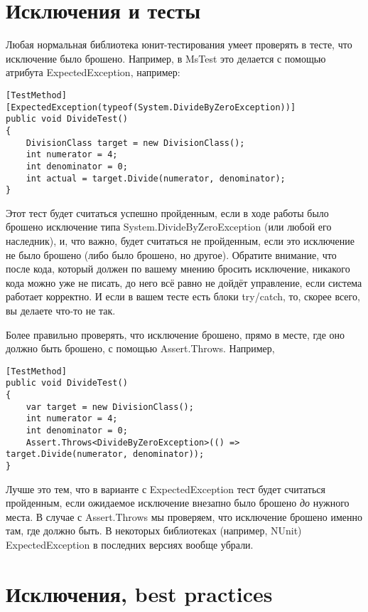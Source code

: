 \documentclass[a5paper]{article}
\begin{document}
\section{Исключения и тесты}

Любая нормальная библиотека юнит-тестирования умеет проверять в тесте, что исключение было брошено. Например, в MsTest это делается с помощью атрибута ExpectedException, например: 

\begin{verbatim}
[TestMethod]
[ExpectedException(typeof(System.DivideByZeroException))]
public void DivideTest()
{
    DivisionClass target = new DivisionClass();
    int numerator = 4;
    int denominator = 0;
    int actual = target.Divide(numerator, denominator);
}
\end{verbatim}

Этот тест будет считаться успешно пройденным, если в ходе работы было брошено исключение типа System.DivideByZeroException (или любой его наследник), и, что важно, будет считаться не пройденным, если это исключение не было брошено (либо было брошено, но другое). Обратите внимание, что после кода, который должен по вашему мнению бросить исключение, никакого кода можно уже не писать, до него всё равно не дойдёт управление, если система работает корректно. И если в вашем тесте есть блоки try/catch, то, скорее всего, вы делаете что-то не так.

Более правильно проверять, что исключение брошено, прямо в месте, где оно должно быть брошено, с помощью Assert.Throws. Например,

\begin{verbatim}
[TestMethod]
public void DivideTest()
{
    var target = new DivisionClass();
    int numerator = 4;
    int denominator = 0;
    Assert.Throws<DivideByZeroException>(() => target.Divide(numerator, denominator));
}
\end{verbatim}

Лучше это тем, что в варианте с ExpectedException тест будет считаться пройденным, если ожидаемое исключение внезапно было брошено \emph{до} нужного места. В случае с Assert.Throws мы проверяем, что исключение брошено именно там, где должно быть. В некоторых библиотеках (например, NUnit) ExpectedException в последних версиях вообще убрали.

\section{Исключения, best practices}
\end{document}
